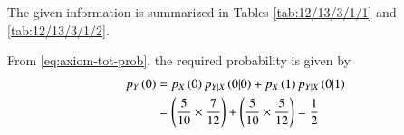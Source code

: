 The given information is summarized in Tables \ref{tab:12/13/3/1/1} and 
\ref{tab:12/13/3/1/2}.
\begin{table}[H]
\centering

%
\caption{}
\label{tab:12/13/3/1/1}
\end{table}
%
\begin{table}[H]
\centering

\caption{}
\label{tab:12/13/3/1/2}
\end{table}
From
\eqref{eq:axiom-tot-prob},
the required probability is given by
\begin{align}
p_{Y}\left(0\right) &= p_{X}\left(0\right)p_{Y|X}\left(0|0\right) + p_{X}\left(1\right)p_{Y|X}\left(0|1\right)\\
&= \left(\frac{5}{10} \times \frac{7}{12}\right) + \left(\frac{5}{10} \times \frac{5}{12}\right)
= \frac{1}{2}
\end{align}



